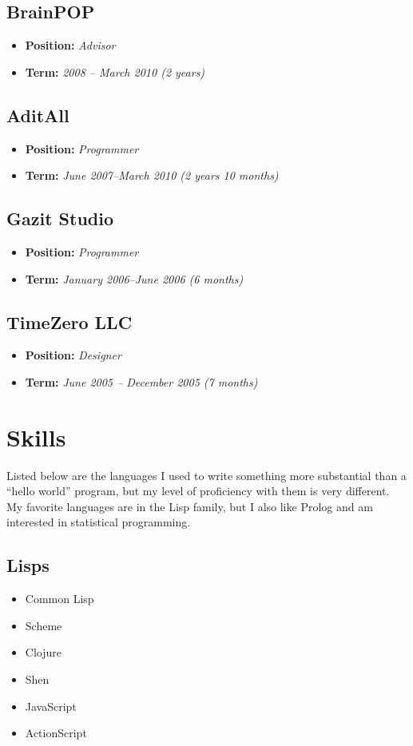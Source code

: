 \documentclass[11pt]{article}
\begin{document}
\subsection{BrainPOP}
\label{sec-3-5}
\begin{itemize}
\item \textbf{Position:} \emph{Advisor}
\item \textbf{Term:} \emph{2008 – March 2010 (2 years)}
\end{itemize}
\subsection{AditAll}
\label{sec-3-6}
\begin{itemize}
\item \textbf{Position:} \emph{Programmer}
\item \textbf{Term:} \emph{June 2007--March 2010 (2 years 10 months)}
\end{itemize}
\subsection{Gazit Studio}
\label{sec-3-7}
\begin{itemize}
\item \textbf{Position:} \emph{Programmer}
\item \textbf{Term:} \emph{January 2006--June 2006 (6 months)}
\end{itemize}
\subsection{TimeZero LLC}
\label{sec-3-8}
\begin{itemize}
\item \textbf{Position:} \emph{Designer}
\item \textbf{Term:} \emph{June 2005 – December 2005 (7 months)}
\end{itemize}
\section{Skills}
\label{sec-4}
Listed below are the languages I used to write something more substantial
than a ``hello world'' program, but my level of proficiency with them is
very different.  My favorite languages are in the Lisp family, but I also
like Prolog and am interested in statistical programming.

\subsection{Lisps}
\label{sec-4-1}
\begin{itemize}
\item Common Lisp
\item Scheme
\item Clojure
\item Shen
\item JavaScript
\item ActionScript
\end{itemize}
\end{document}
